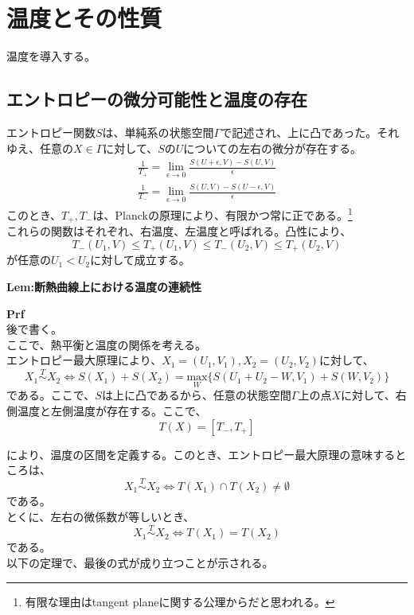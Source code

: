 \documentclass[a4paper,11pt]{jsarticle}
\numberwithin{equation}{section}
\begin{document}
\section{温度とその性質}
温度を導入する。\\
\subsection{エントロピーの微分可能性と温度の存在}
エントロピー関数$S$は、単純系の状態空間$\Gamma$で記述され、上に凸であった。それゆえ、任意の$X \in \Gamma$に対して、$S$の$U$についての左右の微分が存在する。\\
\begin{align}
    \frac{1}{T_+} =\lim_{\epsilon \to 0} \frac{S(U+\epsilon,V)-S(U,V)}{\epsilon}\\
    \frac{1}{T_-} =\lim_{\epsilon \to 0} \frac{S(U,V)-S(U-\epsilon,V)}{\epsilon}
\end{align}
このとき、$T_+,T_-$は、Planckの原理により、有限かつ常に正である。\footnote{有限な理由はtangent planeに関する公理からだと思われる。}\\
これらの関数はそれぞれ、右温度、左温度と呼ばれる。凸性により、
\begin{equation}
    T_-(U_1,V) \leq T_+(U_1,V) \leq T_-(U_2,V) \leq T_+(U_2,V)
\end{equation}
が任意の$U_1<U_2$に対して成立する。\\

\begin{itembox}[l]{\textbf{Lem:断熱曲線上における温度の連続性}}


\end{itembox}
\textbf{Prf}\\
後で書く。\hfill\qedsymbol\\

ここで、熱平衡と温度の関係を考える。\\
エントロピー最大原理により、$X_1=(U_1,V_1),X_2=(U_2,V_2)$に対して、
\begin{equation}
    X_1 \overset{T}{\sim} X_2 \Leftrightarrow S(X_1) +S(X_2) =\underset{W}{\text{max}}\{S(U_1+U_2-W,V_1)+S(W,V_2)\}
\end{equation}
である。ここで、$S$は上に凸であるから、任意の状態空間$\Gamma$上の点$X$に対して、右側温度と左側温度が存在する。ここで、
\begin{equation}
    T(X) = [T_-,T_+]
\end{equation}

により、温度の区間を定義する。このとき、エントロピー最大原理の意味するところは、
\begin{equation}
    X_1 \overset{T}{\sim} X_2 \Leftrightarrow T(X_1)\cap T(X_2) \neq \emptyset
\end{equation}
である。\\
とくに、左右の微係数が等しいとき、
\begin{equation}
    X_1 \overset{T}{\sim} X_2 \Leftrightarrow T(X_1)=T(X_2)
\end{equation}
である。\\
以下の定理で、最後の式が成り立つことが示される。\\
\end{document}
